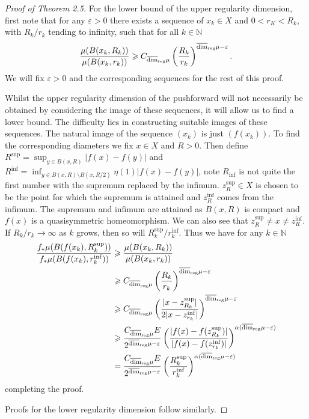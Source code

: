 \documentclass[12pt]{amsart}
\numberwithin{equation}{section}
\renewcommand{\ge}{\geqslant}
\newcommand{\urdim}{\overline{\dim}_{\textup{reg}}}
\begin{document}
\begin{proof}[Proof of Theorem 2.5]
For the lower bound of the upper regularity dimension, first note that for any $\varepsilon > 0$ there exists a sequence of $x_k \in X$ and $0< r_K < R_k$, with $R_k / r_k$ tending to infinity, such that for all $k\in \mathbb{N}$
\[
\frac{\mu(B(x_k,R_k))}{\mu(B(x_k,r_k))} \ge C_{\urdim \mu} \left(\frac{R_k}{r_k} \right)^{\urdim \mu-\varepsilon}.
\]
We will fix $\varepsilon>0$ and the corresponding sequences for the rest of this proof.

Whilst the upper regularity dimension of the pushforward will not necessarily be obtained by considering the image of these sequences, it will allow us to find a lower bound. The difficulty lies in constructing suitable images of these sequences. The natural image of the sequence $(x_k)$ is just $(f(x_k) )$. To find the corresponding diameters we fix $x\in X$ and $R>0$. Then define $R^{\sup} = \sup_{y \in B(x,R)} \lvert f(x) - f(y) \rvert$ and $R^{\inf} = \inf_{y \in B(x,R) \setminus B(x,R/2)} \eta(1) \lvert f(x) - f(y) \rvert$, note $R_{\inf}$ is not quite the first number with the supremum replaced by the infimum. $z_{R}^{\sup} \in X$ is chosen to be the point for which the supremum is attained and $z_{R}^{\inf}$ comes from the infimum. The supremum and infimum are attained as $B(x,R)$ is compact and $f(x)$ is a quasisymmetric homeomorphism. We can also see that $z_{R}^{\sup} \neq x \neq z_{R}^{\inf}$. If $R_k/r_k \rightarrow \infty$ as $k$ grows, then so will $R_k^{\sup}/r_k^{\inf}$. Thus we have for any $k\in \mathbb{N}$
\begin{align*}
\frac{f_* \mu(B(f(x_k),R_k^{\sup}))}{f_*\mu(B(f(x_k),r_k^{\inf}))} &\ge \frac{\mu(B(x_k,R_k))}{\mu(B(x_k,r_k))} \\
& \ge  C_{\urdim \mu} \left(\frac{R_k}{r_k} \right)^{\urdim \mu-\varepsilon} \\ 
& \ge C_{\urdim \mu} \left ( \frac{\lvert x- z_{R_k}^{\sup} \rvert}{2\lvert x- z_{r_k}^{\inf} \rvert}\right)^{\urdim \mu-\varepsilon} \\
& \ge \frac{C_{\urdim \mu}E}{2^{\urdim \mu-\varepsilon}} \left(\frac{\lvert f(x) - f(z_{R_k}^{\sup})\rvert}{\lvert f(x)- f(z_{r_k}^{\inf}) \rvert} \right)^{\alpha(\urdim \mu-\varepsilon)} \\
& = \frac{C_{\urdim \mu}E}{2^{\urdim \mu-\varepsilon}}\left(\frac{R_k^{\sup}}{r_k^{\inf}} \right)^{\alpha(\urdim \mu-\varepsilon)}
\end{align*}
completing the proof.

Proofs for the lower regularity dimension follow similarly.

\end{proof}
\end{document}
